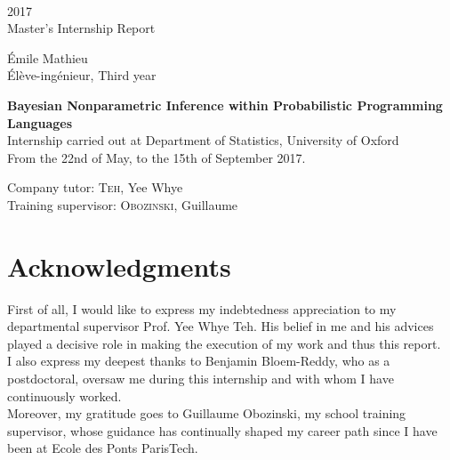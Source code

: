 \documentclass[twoside,10pt,openany,a4paper]{rapport}
\begin{document}
\begin{titlepage}
\begin{center}
      \vspace{0.3cm}
      \\
      
      \vspace{0.7cm}
      2017\\
      Master's Internship Report
      
      \vspace{0.3cm}
      Émile Mathieu\\
      Élève-ingénieur, Third year
      
      \vspace{2cm}
      \Huge{\textbf{Bayesian Nonparametric Inference within Probabilistic Programming Languages}}\\

      \vfill
      \normalsize{}
      Internship carried out at Department of Statistics, University of Oxford \\
      From the 22nd of May, to the 15th of September 2017.
      
      \vspace{0.3cm}
       Company tutor: \textsc{Teh}, Yee Whye\\
       Training supervisor: \textsc{Obozinski}, Guillaume

      \end{center}
\end{titlepage}

\cleardoublepage


\chapter{Acknowledgments}

First of all, I would like to express my indebtedness appreciation to my departmental supervisor Prof. Yee Whye Teh. His belief in me and his advices played a decisive role in making the execution of my work and thus this report. \\

I also express my deepest thanks to Benjamin Bloem-Reddy, who as a postdoctoral, oversaw me during this internship and with whom I have continuously worked. \\

Moreover, my gratitude goes to Guillaume Obozinski, my school training supervisor, whose guidance has continually shaped my career path since I have been at Ecole des Ponts ParisTech.
\end{document}
